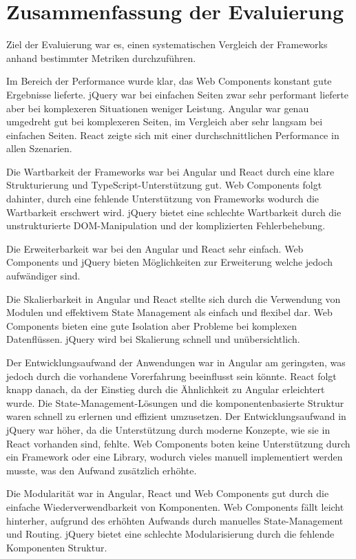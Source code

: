 \documentclass[oneside]{ausarbeitung}
\begin{document}
\section{Zusammenfassung der Evaluierung}

Ziel der Evaluierung war es, einen systematischen Vergleich der Frameworks anhand bestimmter Metriken durchzuführen. 

Im Bereich der Performance wurde klar, das Web Components konstant gute Ergebnisse lieferte. jQuery war bei einfachen Seiten zwar sehr performant lieferte aber bei komplexeren Situationen weniger Leistung. Angular war genau umgedreht gut bei komplexeren Seiten, im Vergleich aber sehr langsam bei einfachen Seiten. React zeigte sich mit einer durchschnittlichen Performance in allen Szenarien.

Die Wartbarkeit der Frameworks war bei Angular und React durch eine klare Strukturierung und TypeScript-Unterstützung gut. Web Components folgt dahinter, durch eine fehlende Unterstützung von Frameworks wodurch die  Wartbarkeit erschwert wird. jQuery bietet eine schlechte Wartbarkeit durch die unstrukturierte DOM-Manipulation und der komplizierten Fehlerbehebung. 

Die Erweiterbarkeit war bei den Angular und React sehr einfach. Web Components und jQuery bieten Möglichkeiten zur Erweiterung welche jedoch aufwändiger sind.

Die Skalierbarkeit in Angular und React stellte sich durch die Verwendung von Modulen und effektivem State Management als einfach und flexibel dar. Web Components bieten eine gute Isolation aber Probleme bei komplexen Datenflüssen. jQuery wird bei Skalierung schnell und unübersichtlich.

Der Entwicklungsaufwand der Anwendungen war in Angular am geringsten, was jedoch durch die vorhandene Vorerfahrung beeinflusst sein könnte. React folgt knapp danach, da der Einstieg durch die Ähnlichkeit zu Angular erleichtert wurde. Die State-Management-Lösungen und die komponentenbasierte Struktur waren schnell zu erlernen und effizient umzusetzen. Der Entwicklungsaufwand in jQuery war höher, da die Unterstützung durch moderne Konzepte, wie sie in React vorhanden sind, fehlte. Web Components boten keine Unterstützung durch ein Framework oder eine Library, wodurch vieles manuell implementiert werden musste, was den Aufwand zusätzlich erhöhte.

Die Modularität war in Angular, React und Web Components gut durch die einfache Wiederverwendbarkeit von Komponenten. Web Components fällt leicht hinterher, aufgrund des erhöhten Aufwands durch manuelles State-Management und Routing. jQuery bietet eine schlechte Modularisierung durch die fehlende Komponenten Struktur.
\end{document}
